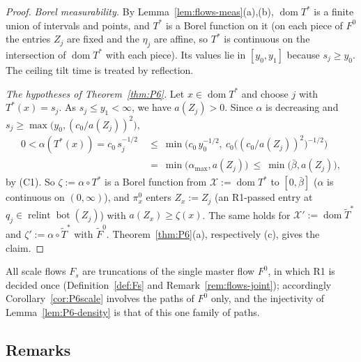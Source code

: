 \documentclass[11pt]{amsart}
\newcommand{\cX}{\mathcal X}
\newcommand{\relint}{\operatorname{relint}}
\newcommand{\Bot}{\operatorname{bot}}
\newcommand{\amax}{\alpha_{\max}}
\newcommand{\bbar}{\bar\beta}
\newcommand{\Fz}{F^{0}}
\newcommand{\Fs}{F_{s}}
\newcommand{\Tstar}{T^{*}}
\theoremstyle{definition}
\theoremstyle{remark}
\numberwithin{equation}{section}
\begin{document}
\begin{proof}
\emph{Borel measurability.} By Lemma~\ref{lem:flows-meas}(a),(b), $\operatorname{dom}\Tstar$ is a finite union of
intervals and points, and $\Tstar$ is a Borel function on it (on each piece of $\Fz$ the entries $Z_j$ are fixed and
the $\eta_j$ are affine, so $\Tstar$ is continuous on the intersection of $\operatorname{dom}\Tstar$ with each piece).
Its values lie in $[y_0,y_1]$ because $s_j\ge y_0$. The ceiling tilt time is treated by reflection.

\emph{The hypotheses of Theorem~\ref{thm:P6}.} Let $x\in\operatorname{dom}\Tstar$ and choose $j$ with $\Tstar(x)=s_j$.
As $s_j\le y_1<\infty$, we have $a(Z_j)>0$. Since $\alpha$ is decreasing and
$s_j\ge\max\big(y_0,(c_0/a(Z_j))^2\big)$,
\[
\begin{aligned}
0<\alpha(\Tstar(x))=c_0\,s_j^{-1/2}\ &\le\ \min\Big(c_0\,y_0^{-1/2},\ c_0\big((c_0/a(Z_j))^2\big)^{-1/2}\Big)\\
&=\ \min\big(\amax,a(Z_j)\big)\ \le\ \min\big(\bbar,a(Z_j)\big),
\end{aligned}
\]
by (C1). So $\zeta:=\alpha\circ\Tstar$ is a Borel function from $\cX:=\operatorname{dom}\Tstar$ to $[0,\bbar]$ ($\alpha$
is continuous on $(0,\infty)$), and $\pi^0_x$ enters $Z_x:=Z_j$ (an R1-passed entry at $q_j\in\relint\Bot(Z_j)$) with
$a(Z_x)\ge\zeta(x)$. The same holds for $\cX':=\operatorname{dom}\tilde T^*$ and $\zeta':=\alpha\circ\tilde T^*$ with
$\tilde F^0$. Theorem~\ref{thm:P6}(a), respectively (c), gives the claim.
\end{proof}

All scale flows $\Fs$ are truncations of the single master flow $\Fz$, in which R1 is decided once
(Definition~\ref{def:Fs} and Remark~\ref{rem:flows-joint}); accordingly Corollary~\ref{cor:P6scale} involves the paths
of $\Fz$ only, and the injectivity of Lemma~\ref{lem:P6-density} is that of this one family of paths.

\subsection{Remarks}\label{ssec:P6-remarks}
\end{document}
